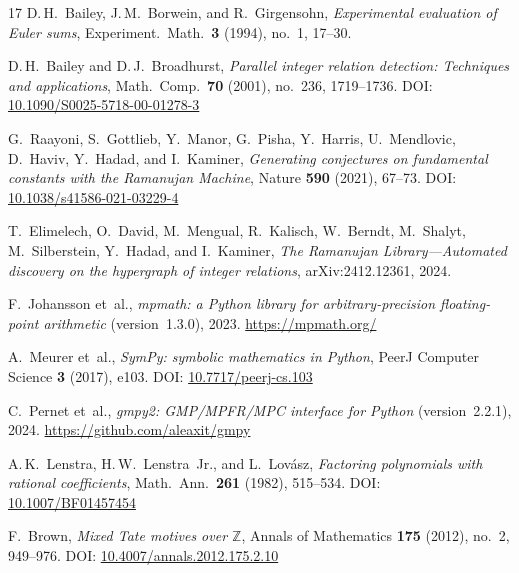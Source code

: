 \documentclass[11pt]{amsart}
\theoremstyle{remark}
\begin{document}
\begin{thebibliography}{17}
D.\,H.~Bailey, J.\,M.~Borwein, and R.~Girgensohn,
\emph{Experimental evaluation of Euler sums},
Experiment.\ Math.\ \textbf{3} (1994), no.~1, 17--30.

D.\,H.~Bailey and D.\,J.~Broadhurst,
\emph{Parallel integer relation detection: Techniques and applications},
Math.\ Comp.\ \textbf{70} (2001), no.~236, 1719--1736.
\newline DOI: \href{https://doi.org/10.1090/S0025-5718-00-01278-3}%
{10.1090/S0025-5718-00-01278-3}

G.~Raayoni, S.~Gottlieb, Y.~Manor, G.~Pisha, Y.~Harris, U.~Mendlovic, D.~Haviv,
Y.~Hadad, and I.~Kaminer,
\emph{Generating conjectures on fundamental constants with the Ramanujan Machine},
Nature \textbf{590} (2021), 67--73.
\newline DOI: \href{https://doi.org/10.1038/s41586-021-03229-4}%
{10.1038/s41586-021-03229-4}

T.~Elimelech, O.~David, M.~Mengual, R.~Kalisch, W.~Berndt, M.~Shalyt,
M.~Silberstein, Y.~Hadad, and I.~Kaminer,
\emph{The Ramanujan Library---Automated discovery on the hypergraph of integer
relations},
arXiv:2412.12361, 2024.

F.~Johansson et~al.,
\emph{mpmath: a Python library for arbitrary-precision floating-point arithmetic}
(version~1.3.0), 2023.
\url{https://mpmath.org/}

A.~Meurer et~al.,
\emph{SymPy: symbolic mathematics in Python},
PeerJ Computer Science \textbf{3} (2017), e103.
\newline DOI: \href{https://doi.org/10.7717/peerj-cs.103}{10.7717/peerj-cs.103}

C.~Pernet et~al.,
\emph{gmpy2: GMP/MPFR/MPC interface for Python} (version~2.2.1), 2024.
\url{https://github.com/aleaxit/gmpy}

A.\,K.~Lenstra, H.\,W.~Lenstra~Jr., and L.~Lov\'asz,
\emph{Factoring polynomials with rational coefficients},
Math.\ Ann.\ \textbf{261} (1982), 515--534.
\newline DOI: \href{https://doi.org/10.1007/BF01457454}{10.1007/BF01457454}

F.~Brown,
\emph{Mixed Tate motives over $\mathbb{Z}$},
Annals of Mathematics \textbf{175} (2012), no.~2, 949--976.
\newline DOI: \href{https://doi.org/10.4007/annals.2012.175.2.10}%
{10.4007/annals.2012.175.2.10}


\end{thebibliography}
\end{document}
